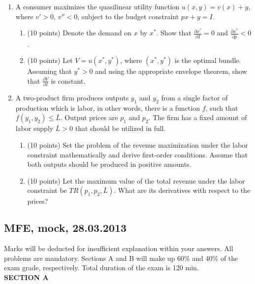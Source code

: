 \begin{enumerate}[resume]
\item A consumer maximizes the quasilinear utility function $u(x,y)=v(x)+y$, where $v'>0$, $v''<0$, subject to the budget constraint $px+y=I$.
\begin{enumerate}
\item (10 points) Denote the demand on $x$ by $x^*$. Show that $\frac{\partial x^*}{\partial I}=0$ and $\frac{\partial x^*}{\partial p}<0$.
\item (10 points) Let $V=u(x^*,y^*)$, where $(x^*,y^*)$ is the optimal bundle. Assuming that $y^*>0$ and using the appropriate envelope theorem, show that $\frac{\partial V}{\partial I}$ is constant.
\end{enumerate}

\item A two-product firm produces outputs $y_1$ and $y_2$ from a single factor of production which is labor, in other words, there is a function $f$, such that $f(y_1,y_2)\leq \bar{L}$. Output prices are $p_1$ and $p_2$. The firm has a fixed amount of labor supply $\bar{L}>0$ that should be utilized in full.
\begin{enumerate}
\item (10 points) Set the problem of the revenue maximization under the labor constraint mathematically and derive first-order conditions. Assume that both outputs should be produced in positive amounts.
\item (10 points) Let the maximum value of the total revenue under the labor constraint be $TR(p_1,p_2,\bar{L})$. What are its derivatives with respect to the prices?
\end{enumerate}

\end{enumerate}

\subsection{MFE, mock, 28.03.2013}

Marks will be deducted for insufficient explanation within your answers. All problems are mandatory. Sections A and B will make up 60\% and 40\% of the exam grade, respectively. Total duration of the exam is 120 min. \\

\textbf{SECTION A}
\vspace{20pt}

